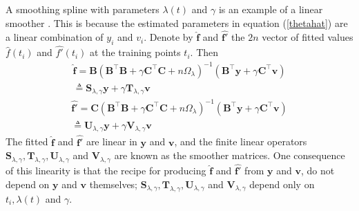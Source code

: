 A smoothing spline with parameters $\lambda(t)$ and $\gamma$ is an example of a linear smoother \cite{esl2009}. This is because the estimated parameters in equation (\ref{thetahat}) are a linear combination of $y_i$ and $v_i$. Denote by $\hat{\mathbf{f}}$ and $\hat{\mathbf{f}'}$ the $2n$ vector of fitted values $\hat{f}(t_i)$ and $\hat{f'}(t_i)$ at the training points $t_i$. Then
\begin{equation}
\begin{split}
\hat{\mathbf{f}} =\mathbf{B}(\mathbf{B}^\top\mathbf{B}+\gamma\mathbf{C}^\top\mathbf{C}+n\Omega_{\lambda})^{-1}(\mathbf{B}^\top\mathbf{y}+\gamma\mathbf{C}^\top\mathbf{v})\\
\triangleq \mathbf{S}_{\lambda,\gamma}\mathbf{y}+\gamma\mathbf{T}_{\lambda,\gamma}\mathbf{v} 
\end{split}
\end{equation}
\begin{equation}
\begin{split}
\hat{\mathbf{f}'}
=\mathbf{C}(\mathbf{B}^\top\mathbf{B}+\gamma\mathbf{C}^\top\mathbf{C}+n\Omega_{\lambda})^{-1}(\mathbf{B}^\top\mathbf{y}+\gamma\mathbf{C}^\top\mathbf{v})\\
\triangleq\mathbf{U}_{\lambda,\gamma}\mathbf{y}+\gamma\mathbf{V}_{\lambda,\gamma}\mathbf{v}
\end{split}
\end{equation}
The fitted $\hat{\mathbf{f}}$ and $\hat{\mathbf{f}'}$ are linear in $\mathbf{y}$ and $\mathbf{v}$, and the finite linear operators $\mathbf{S}_{\lambda,\gamma}, \mathbf{T}_{\lambda,\gamma}, \mathbf{U}_{\lambda,\gamma}$ and $\mathbf{V}_{\lambda,\gamma}$ are known as the smoother matrices. One consequence of this linearity is that the recipe for producing $\hat{\mathbf{f}}$ and $\hat{\mathbf{f}'}$ from $\mathbf{y}$ and $\mathbf{v}$, do not depend on $\mathbf{y}$ and $\mathbf{v}$ themselves; $\mathbf{S}_{\lambda,\gamma}, \mathbf{T}_{\lambda,\gamma}, \mathbf{U}_{\lambda,\gamma}$ and $\mathbf{V}_{\lambda,\gamma}$ depend only on $t_i,\lambda(t)$ and $\gamma$.

